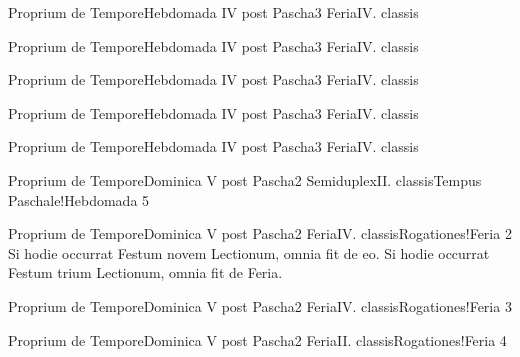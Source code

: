 \documentclass[liber-responsorialis_aestivus.tex]{subfiles}
\begin{document}
	{Proprium de Tempore}{Hebdomada IV post Pascha}{3}{}
	{Feria}{IV. classis}{}
	{}
	{}
 

	{Proprium de Tempore}{Hebdomada IV post Pascha}{3}{}
	{Feria}{IV. classis}{}
	{}
	{}
 

	{Proprium de Tempore}{Hebdomada IV post Pascha}{3}{}
	{Feria}{IV. classis}{}
	{}
	{}
 

	{Proprium de Tempore}{Hebdomada IV post Pascha}{3}{}
	{Feria}{IV. classis}{}
	{}
	{}
 

	{Proprium de Tempore}{Hebdomada IV post Pascha}{3}{}
	{Feria}{IV. classis}{}
	{}
	{}
 

	{Proprium de Tempore}{Dominica V post Pascha}{2}{}
	{Semiduplex}{II. classis}{Tempus Paschale!Hebdomada 5}
	{}
	{}

	{Proprium de Tempore}{Dominica V post Pascha}{2}{}
	{Feria}{IV. classis}{Rogationes!Feria 2}
	{Si hodie occurrat Festum novem Lectionum, omnia fit de eo. Si hodie occurrat Festum trium Lectionum, omnia fit de Feria.}
	{}

	{Proprium de Tempore}{Dominica V post Pascha}{2}{}
	{Feria}{IV. classis}{Rogationes!Feria 3}
	{}
	{}
 

	{Proprium de Tempore}{Dominica V post Pascha}{2}{}
	{Feria}{II. classis}{Rogationes!Feria 4}
	{}
	{}
 
\end{document}
